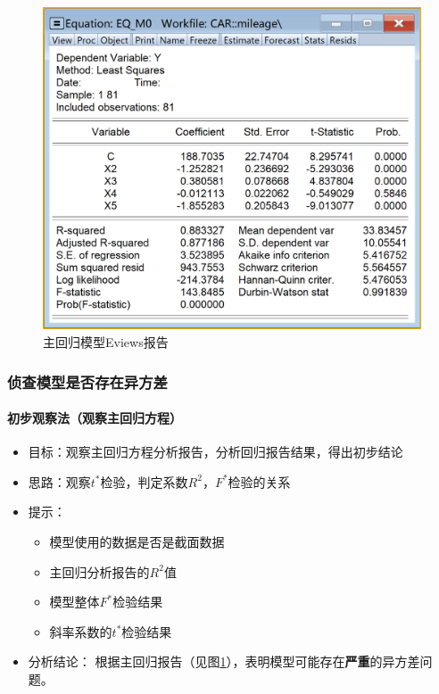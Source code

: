 \documentclass[12pt,(landscape,a4paper),(portrait,a4paper)]{article}
\providecommand{\tightlist}{%
  \setlength{\itemsep}{0pt}\setlength{\parskip}{0pt}}
\let\oldparagraph\paragraph
\renewcommand{\paragraph}[1]{\oldparagraph{#1}\mbox{}}
\begin{document}
\begin{figure}

{\centering \includegraphics[width=17.86in]{picture/lab6-heteroskedasticity/2-eq-m0-report} 

}

\caption{主回归模型Eviews报告}\label{fig:fig-eq-m0-report}
\end{figure}

\subsubsection{侦查模型是否存在异方差}

\paragraph{初步观察法（观察主回归方程）}

\begin{itemize}
\tightlist
\item
  目标：观察主回归方程分析报告，分析回归报告结果，得出初步结论
\item
  思路：观察\(t^{\ast}\)检验，判定系数\(R^2\)，\(F^{\ast}\)检验的关系
\item
  提示：

  \begin{itemize}
  \tightlist
  \item
    模型使用的数据是否是截面数据
  \item
    主回归分析报告的\(R^2\)值
  \item
    模型整体\(F^{\ast}\)检验结果
  \item
    斜率系数的\(t^\ast\)检验结果
  \end{itemize}
\item
  分析结论：
  根据主回归报告（见图\ref{fig:fig-eq-m0-report}），表明模型可能存在\textbf{严重}的异方差问题。
\end{itemize}
\end{document}
